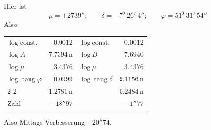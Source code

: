 Hier ist
\[
\mu=+2739'';\qquad\delta=-7^0\ 26'\ 4'';\qquad\varphi=51^0\ 31'\ 54''
\]
Also
\begin{center}
\begin{tabular}{lr@{\qquad\qquad}lr}
$\log\mathrm{const.}$ & $0.0012$ & $\log\mathrm{const.}$ & $0.0012$\\
$\log A$ & $7.7394\,\mathrm n$ & $\log B$ & $7.6940$\\
$\log\mu$ & $3.4376$ & $\log\mu$ & $3.4376$\\
$\log\operatorname{tang}\varphi$ & $0.0999$ & $\log\operatorname{tang}\delta$ & $9.1156\,\mathrm n$\\\cline{2-2}\cline{4-4}
& $1.2781\,\mathrm n$ & & $0.2484\,\mathrm n$\\
Zahl & $-18''97$ & & $-1''77$
\end{tabular}
\end{center}
Also Mittags-Verbesserung $-20''74$.

